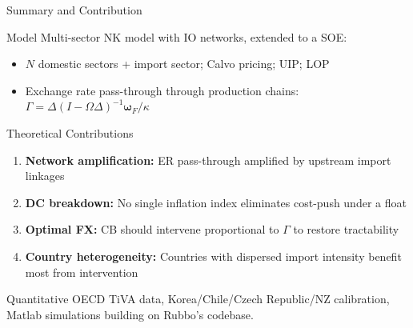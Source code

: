 \documentclass[aspectratio=169]{beamer}
\begin{document}
\begin{frame}{Summary and Contribution}

\begin{block}{Model}
Multi-sector NK model with IO networks, extended to a SOE:
\begin{itemize}
    \item $N$ domestic sectors + import sector; Calvo pricing; UIP; LOP
    \item Exchange rate pass-through through production chains: $\Gamma = \Delta(I-\Omega\Delta)^{-1}\bm{\omega}_F/\kappa$
\end{itemize}
\end{block}

\begin{block}{Theoretical Contributions}
\begin{enumerate}
    \item \textbf{Network amplification:} ER pass-through amplified by upstream import linkages
    \item \textbf{DC breakdown:} No single inflation index eliminates cost-push under a float
    \item \textbf{Optimal FX:} CB should intervene proportional to $\Gamma$ to restore tractability
    \item \textbf{Country heterogeneity:} Countries with dispersed import intensity benefit most from intervention
\end{enumerate}
\end{block}

\begin{block}{Quantitative}
OECD TiVA data, Korea/Chile/Czech Republic/NZ calibration, Matlab simulations building on Rubbo's codebase.
\end{block}
\end{frame}
\end{document}
